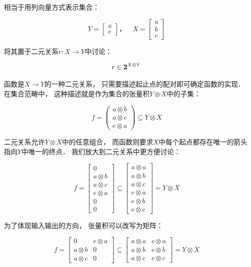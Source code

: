 \documentclass[10pt, openany]{book}
\begin{document}
相当于用列向量方式表示集合：

$$
Y = \begin{bmatrix}
a \\ e    
\end{bmatrix}， \quad
X = \begin{bmatrix}
a \\ b \\ c    
\end{bmatrix}
$$

将其置于二元关系$r: X \to Y$中讨论：

$$
r \in \textbf 2^{X \otimes Y}
$$

函数是$X \to Y$的一种二元关系，
只需要描述起止点的配对即可确定函数的实现．
在集合范畴中，
这种描述就是作为集合的张量积$Y \otimes X$中的子集：

$$
f = \begin{pmatrix}
a \otimes b \\ a \otimes c \\ e \otimes a
\end{pmatrix}
\subseteq Y \otimes X
$$

二元关系允许$Y \otimes X$中的任意组合，
而函数则要求$X$中每个起点都存在唯一的箭头指向$Y$中唯一的终点．
我们放大到二元关系中更方便讨论：

$$
f = \begin{bmatrix}
0 \\ a \otimes b \\ a \otimes c \\ 
e \otimes a \\ 0 \\ 0
\end{bmatrix}
\subseteq \begin{bmatrix}
a \otimes a \\ a \otimes b \\ a \otimes c \\
e \otimes a \\ e \otimes b \\ e \otimes c
\end{bmatrix}
= Y \otimes X
$$

为了体现输入输出的方向，
张量积可以改写为矩阵：

$$
f = \begin{bmatrix}
0 & e \otimes a \\ 
a \otimes b & 0 \\ 
a \otimes c & 0
\end{bmatrix}
\subseteq \begin{bmatrix}
a \otimes a & e \otimes a \\ 
a \otimes b & e \otimes b \\ 
a \otimes c & e \otimes c
\end{bmatrix}
= Y \otimes X
$$
\end{document}
